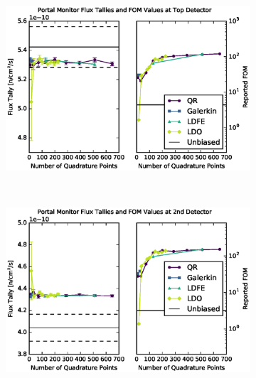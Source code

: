 \clearpage
\begin{figure}[!htb]
\begin{subfigure}{\textwidth}
\centering
\includegraphics[max height=0.445\textheight]
{img/cargo-plots/mcnp/fwc-14.eps}
\end{subfigure}
\\
\begin{subfigure}{\textwidth}
\centering
\includegraphics[max height=0.445\textheight]
{img/cargo-plots/mcnp/fwc-24.eps}
\end{subfigure}
\end{figure}
\clearpage

